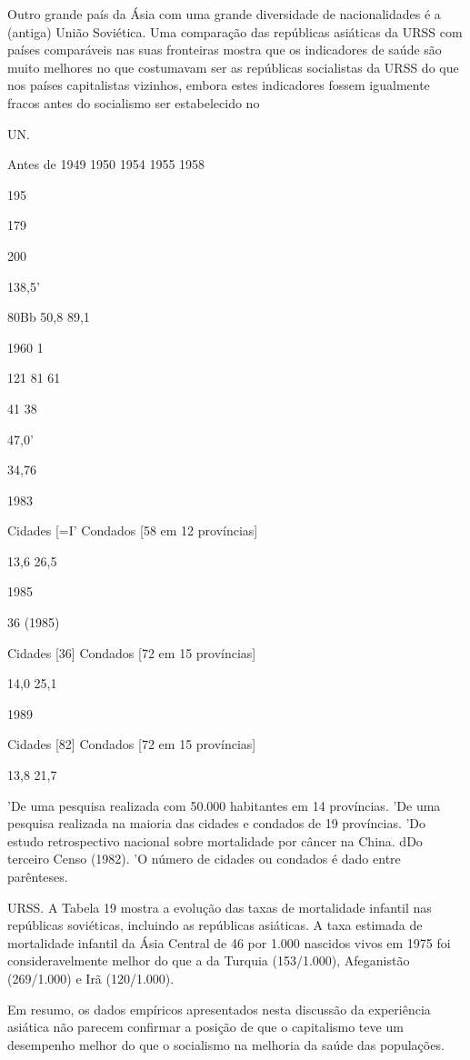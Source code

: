 \documentclass[twocolumn,amsmath,amssymb,aps,pre,floatfix]{revtex4-2}
\begin{document}
\par
Outro grande país da Ásia com uma grande diversidade de nacionalidades é a (antiga) União Soviética. Uma comparação das repúblicas asiáticas da URSS com países comparáveis ​​nas suas fronteiras mostra que os indicadores de saúde são muito melhores no que costumavam ser as repúblicas socialistas da URSS do que nos países capitalistas vizinhos, embora estes indicadores fossem igualmente fracos antes do socialismo ser estabelecido no
\par
UN.
\par
Antes de 1949 1950 1954 1955 1958
\par
195
\par
179
\par
200
\par
138,5'
\par
80Bb 50,8 89,1
\par
1960 1%
\par
121 81 61
\par
41 38
\par
47,0'
\par
34,76
\par
1983
\par
Cidades [=I' Condados [58 em 12 províncias]
\par
13,6 26,5
\par
1985
\par
36 (1985)
\par
Cidades [36] Condados [72 em 15 províncias]
\par
14,0 25,1
\par
1989
\par
Cidades [82] Condados [72 em 15 províncias]
\par
13,8 21,7
\par
'De uma pesquisa realizada com 50.000 habitantes em 14 províncias. 'De uma pesquisa realizada na maioria das cidades e condados de 19 províncias. 'Do estudo retrospectivo nacional sobre mortalidade por câncer na China. dDo terceiro Censo (1982). 'O número de cidades ou condados é dado entre parênteses.
\par
URSS. A Tabela 19 mostra a evolução das taxas de mortalidade infantil nas repúblicas soviéticas, incluindo as repúblicas asiáticas. A taxa estimada de mortalidade infantil da Ásia Central de 46 por 1.000 nascidos vivos em 1975 foi consideravelmente melhor do que a da Turquia (153/1.000), Afeganistão (269/1.000) e Irã (120/1.000).
\par
Em resumo, os dados empíricos apresentados nesta discussão da experiência asiática não parecem confirmar a posição de que o capitalismo teve um desempenho melhor do que o socialismo na melhoria da saúde das populações.
\end{document}
